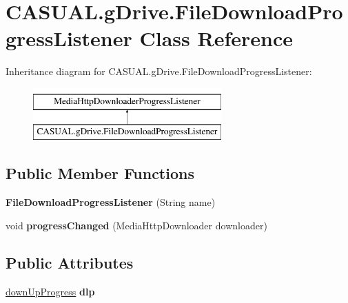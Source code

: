 \hypertarget{classCASUAL_1_1gDrive_1_1FileDownloadProgressListener}{\section{C\-A\-S\-U\-A\-L.\-g\-Drive.\-File\-Download\-Progress\-Listener Class Reference}
\label{classCASUAL_1_1gDrive_1_1FileDownloadProgressListener}
}
Inheritance diagram for C\-A\-S\-U\-A\-L.\-g\-Drive.\-File\-Download\-Progress\-Listener\-:\begin{figure}[H]
\begin{center}
\leavevmode
\includegraphics[height=2.000000cm]{classCASUAL_1_1gDrive_1_1FileDownloadProgressListener}
\end{center}
\end{figure}
\subsection*{Public Member Functions}
\begin{DoxyCompactItemize}
\item 
\hypertarget{classCASUAL_1_1gDrive_1_1FileDownloadProgressListener_a7e6a8545cee584856f2875eb1ab32f12}{{\bfseries File\-Download\-Progress\-Listener} (String name)}\label{classCASUAL_1_1gDrive_1_1FileDownloadProgressListener_a7e6a8545cee584856f2875eb1ab32f12}

\item 
\hypertarget{classCASUAL_1_1gDrive_1_1FileDownloadProgressListener_ad70b34a02a48d49c178d45b2885e8c20}{void {\bfseries progress\-Changed} (Media\-Http\-Downloader downloader)}\label{classCASUAL_1_1gDrive_1_1FileDownloadProgressListener_ad70b34a02a48d49c178d45b2885e8c20}

\end{DoxyCompactItemize}
\subsection*{Public Attributes}
\begin{DoxyCompactItemize}
\item 
\hypertarget{classCASUAL_1_1gDrive_1_1FileDownloadProgressListener_af6c4febdd75950f128f3065d81abcff2}{\hyperlink{classCASUAL_1_1gDrive_1_1downUpProgress}{down\-Up\-Progress} {\bfseries dlp}}\label{classCASUAL_1_1gDrive_1_1FileDownloadProgressListener_af6c4febdd75950f128f3065d81abcff2}

\end{DoxyCompactItemize}


